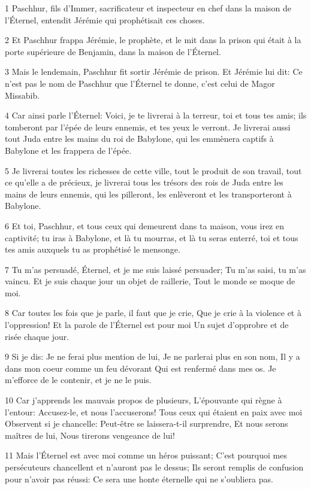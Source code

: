 \par 1 Paschhur, fils d'Immer, sacrificateur et inspecteur en chef dans la maison de l'Éternel, entendit Jérémie qui prophétisait ces choses.
\par 2 Et Paschhur frappa Jérémie, le prophète, et le mit dans la prison qui était à la porte supérieure de Benjamin, dans la maison de l'Éternel.
\par 3 Mais le lendemain, Paschhur fit sortir Jérémie de prison. Et Jérémie lui dit: Ce n'est pas le nom de Paschhur que l'Éternel te donne, c'est celui de Magor Missabib.
\par 4 Car ainsi parle l'Éternel: Voici, je te livrerai à la terreur, toi et tous tes amis; ils tomberont par l'épée de leurs ennemis, et tes yeux le verront. Je livrerai aussi tout Juda entre les mains du roi de Babylone, qui les emmènera captifs à Babylone et les frappera de l'épée.
\par 5 Je livrerai toutes les richesses de cette ville, tout le produit de son travail, tout ce qu'elle a de précieux, je livrerai tous les trésors des rois de Juda entre les mains de leurs ennemis, qui les pilleront, les enlèveront et les transporteront à Babylone.
\par 6 Et toi, Paschhur, et tous ceux qui demeurent dans ta maison, vous irez en captivité; tu iras à Babylone, et là tu mourras, et là tu seras enterré, toi et tous tes amis auxquels tu as prophétisé le mensonge.
\par 7 Tu m'as persuadé, Éternel, et je me suis laissé persuader; Tu m'as saisi, tu m'as vaincu. Et je suis chaque jour un objet de raillerie, Tout le monde se moque de moi.
\par 8 Car toutes les fois que je parle, il faut que je crie, Que je crie à la violence et à l'oppression! Et la parole de l'Éternel est pour moi Un sujet d'opprobre et de risée chaque jour.
\par 9 Si je dis: Je ne ferai plus mention de lui, Je ne parlerai plus en son nom, Il y a dans mon coeur comme un feu dévorant Qui est renfermé dans mes os. Je m'efforce de le contenir, et je ne le puis.
\par 10 Car j'apprends les mauvais propos de plusieurs, L'épouvante qui règne à l'entour: Accusez-le, et nous l'accuserons! Tous ceux qui étaient en paix avec moi Observent si je chancelle: Peut-être se laissera-t-il surprendre, Et nous serons maîtres de lui, Nous tirerons vengeance de lui!
\par 11 Mais l'Éternel est avec moi comme un héros puissant; C'est pourquoi mes persécuteurs chancellent et n'auront pas le dessus; Ils seront remplis de confusion pour n'avoir pas réussi: Ce sera une honte éternelle qui ne s'oubliera pas.

